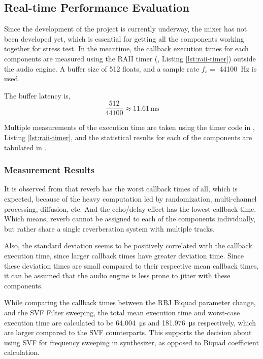 \subsection{Real-time Performance Evaluation}

Since the development of the project is currently underway, the mixer has not been developed yet,
which is essential for getting all the components working together for stress test. In the meantime, 
the callback execution times for each components are measured using the RAII timer (, Listing \ref{lst:raii-timer}) outside 
the audio engine. A buffer size of 512 floats, and a sample rate $f_s = $ \SI{44100}{\hertz} is used. 

The buffer latency is,
$$\frac{512}{44100} \approx 11.61\, \text{ms}$$

Multiple measurements of the execution time are taken using the timer code in , Listing \ref{lst:raii-timer}, 
and the statistical results for each of the components are tabulated in .

\subsubsection{Measurement Results}



It is observed from  that reverb has the worst callback times of all, which is expected, because of the heavy
computation led by randomization, multi-channel processing, diffusion, etc. And the echo/delay effect has
the lowest callback time. Which means, reverb cannot be assigned to each of the components individually, but
rather share a single reverberation system with multiple tracks.

Also, the standard deviation seems to be positively correlated with the callback 
execution time, since larger callback times have greater deviation time. Since these deviation times are
small compared to their respective mean callback times, it can be assumed that the audio engine is less
prone to jitter with these components.

While comparing the callback times between the RBJ Biquad parameter change, and the SVF Filter sweeping,
the total mean execution time and worst-case execution time are calculated to be \SI{64.004}{\micro\second} and 
\SI{181.976}{\micro\second} respectively, which are larger compared to the SVF counterparts. This supports
the decision about using SVF for frequency sweeping in synthesizer, as opposed to Biquad coefficient calculation.


